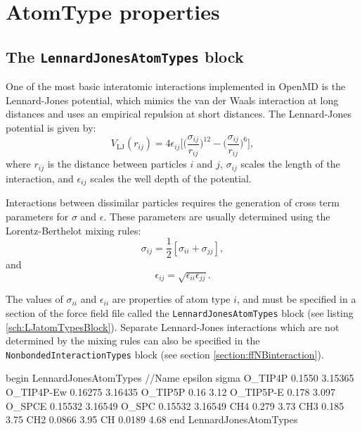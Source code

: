 \documentclass[letterpaper]{report}
\begin{document}
\section{\label{section::ffAtomProperties}AtomType properties}
\subsection{\label{section:ffLJ}The {\tt LennardJonesAtomTypes} block}
One of the most basic interatomic interactions implemented in OpenMD
is the Lennard-Jones potential, which mimics the van der
Waals interaction at long distances and uses an empirical repulsion at
short distances. The Lennard-Jones potential is given by:
\begin{equation}
V_{\text{LJ}}(r_{ij}) = 
	4\epsilon_{ij} \biggl[
	\biggl(\frac{\sigma_{ij}}{r_{ij}}\biggr)^{12}
	- \biggl(\frac{\sigma_{ij}}{r_{ij}}\biggr)^{6}
	\biggr],
\label{eq:lennardJonesPot}
\end{equation}
where $r_{ij}$ is the distance between particles $i$ and $j$,
$\sigma_{ij}$ scales the length of the interaction, and
$\epsilon_{ij}$ scales the well depth of the potential.

Interactions between dissimilar particles requires the generation of
cross term parameters for $\sigma$ and $\epsilon$. These parameters
are usually determined using the Lorentz-Berthelot mixing
rules:\cite{Allen87}
\begin{equation}
\sigma_{ij} = \frac{1}{2}[\sigma_{ii} + \sigma_{jj}],
\label{eq:sigmaMix}
\end{equation}
and
\begin{equation}
\epsilon_{ij} = \sqrt{\epsilon_{ii} \epsilon_{jj}}.
\label{eq:epsilonMix}
\end{equation}

The values of $\sigma_{ii}$ and $\epsilon_{ii}$ are properties of atom
type $i$, and must be specified in a section of the force field file
called the {\tt LennardJonesAtomTypes} block (see listing
\ref{sch:LJatomTypesBlock}).  Separate Lennard-Jones interactions
which are not determined by the mixing rules can also be specified in
the {\tt NonbondedInteractionTypes} block (see section
\ref{section:ffNBinteraction}).

\begin{code}[caption={[An example of a LennardJonesAtomTypes block.] A
simple example of a LennardJonesAtomTypee block.   Units for
$\epsilon$ are kcal / mol and for $\sigma$ are \AA\ .},
label={sch:LJatomTypesBlock}]
begin LennardJonesAtomTypes
//Name          epsilon             sigma       
O_TIP4P         0.1550          3.15365 
O_TIP4P-Ew      0.16275         3.16435
O_TIP5P         0.16            3.12   
O_TIP5P-E       0.178           3.097   
O_SPCE          0.15532         3.16549
O_SPC           0.15532         3.16549
CH4             0.279           3.73
CH3             0.185           3.75
CH2             0.0866          3.95
CH              0.0189          4.68
end LennardJonesAtomTypes
\end{code}
\end{document}
